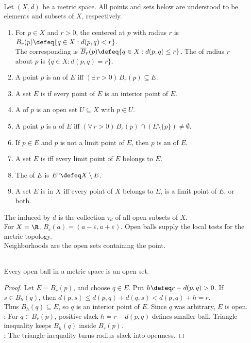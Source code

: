 \begin{definition} \label{def:metric-topology-core-definitions} \\
Let $(X,d)$ be a metric space. All points and sets below are understood to be elements and subsets of $X$, respectively.
\begin{enumerate}[label=(\roman*)]
\setlength{\itemsep}{0pt}
\item For $p\in X$ and $r>0$, the  centered at $p$ with radius $r$ is $B_r(p)\defeq\{q\in X:d(p,q)<r\}$.\\
The corresponding  is $\overline{B}_r(p)\defeq\{q\in X:d(p,q)\leq r\}$. The  of radius $r$ about $p$ is $\{q\in X:d(p,q)=r\}$.
\item A point $p$ is an  of $E$ iff $(\exists\,r>0)\,B_r(p)\subseteq E$.
\item A set $E$ is  if every point of $E$ is an interior point of $E$.
\item A  of $p$ is an open set $U\subseteq X$ with $p\in U$.
\item A point $p$ is a  of $E$ iff $(\forall\,r>0)\,B_r(p)\cap(E\setminus\{p\})\neq\emptyset$.
\item If $p\in E$ and $p$ is not a limit point of $E$, then $p$ is an  of $E$.
\item A set $E$ is  iff every limit point of $E$ belongs to $E$.
\item The  of $E$ is $E^c\defeq X\setminus E$.
\item A set $E$ is  in $X$ iff every point of $X$ belongs to $E$, is a limit point of $E$, or both.
\end{enumerate}
The  induced by $d$ is the collection $\tau_d$ of all open subsets of $X$.\\
For $X=\R$, $B_\varepsilon(a)=(a-\varepsilon,a+\varepsilon)$. Open balls supply the local tests for the metric topology.\\
Neighborhoods are the open sets containing the point.
\end{definition}

\begin{theorem} \label{thm:every-neighborhood-open} \\
Every open ball in a metric space is an open set.
\begin{proof}
Let $E=B_r(p)$, and choose $q\in E$. Put $h\defeq r-d(p,q)>0$. If $s\in B_h(q)$, then $d(p,s)\leq d(p,q)+d(q,s)<d(p,q)+h=r$.\\
Thus $B_h(q)\subseteq E$, so $q$ is an interior point of $E$. Since $q$ was arbitrary, $E$ is open.\\
: For $q\in B_r(p)$, positive slack $h=r-d(p,q)$ defines smaller ball. Triangle inequality keeps $B_h(q)$ inside $B_r(p)$.\\
: The triangle inequality turns radius slack into openness.
\end{proof}
\end{theorem}


